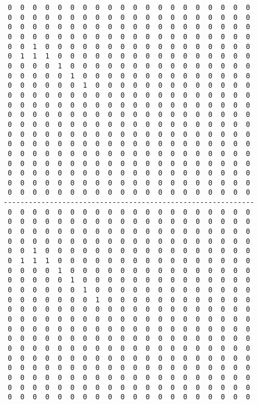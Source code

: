 \begin{verbatim}
 0  0  0  0  0  0  0  0  0  0  0  0  0  0  0  0  0  0  0  0
 0  0  0  0  0  0  0  0  0  0  0  0  0  0  0  0  0  0  0  0
 0  0  0  0  0  0  0  0  0  0  0  0  0  0  0  0  0  0  0  0
 0  0  0  0  0  0  0  0  0  0  0  0  0  0  0  0  0  0  0  0
 0  0  1  0  0  0  0  0  0  0  0  0  0  0  0  0  0  0  0  0
 0  1  1  1  0  0  0  0  0  0  0  0  0  0  0  0  0  0  0  0
 0  0  0  0  1  0  0  0  0  0  0  0  0  0  0  0  0  0  0  0
 0  0  0  0  0  1  0  0  0  0  0  0  0  0  0  0  0  0  0  0
 0  0  0  0  0  0  1  0  0  0  0  0  0  0  0  0  0  0  0  0
 0  0  0  0  0  0  0  0  0  0  0  0  0  0  0  0  0  0  0  0
 0  0  0  0  0  0  0  0  0  0  0  0  0  0  0  0  0  0  0  0
 0  0  0  0  0  0  0  0  0  0  0  0  0  0  0  0  0  0  0  0
 0  0  0  0  0  0  0  0  0  0  0  0  0  0  0  0  0  0  0  0
 0  0  0  0  0  0  0  0  0  0  0  0  0  0  0  0  0  0  0  0
 0  0  0  0  0  0  0  0  0  0  0  0  0  0  0  0  0  0  0  0
 0  0  0  0  0  0  0  0  0  0  0  0  0  0  0  0  0  0  0  0
 0  0  0  0  0  0  0  0  0  0  0  0  0  0  0  0  0  0  0  0
 0  0  0  0  0  0  0  0  0  0  0  0  0  0  0  0  0  0  0  0
 0  0  0  0  0  0  0  0  0  0  0  0  0  0  0  0  0  0  0  0
 0  0  0  0  0  0  0  0  0  0  0  0  0  0  0  0  0  0  0  0
------------------------------------------------------------
 0  0  0  0  0  0  0  0  0  0  0  0  0  0  0  0  0  0  0  0
 0  0  0  0  0  0  0  0  0  0  0  0  0  0  0  0  0  0  0  0
 0  0  0  0  0  0  0  0  0  0  0  0  0  0  0  0  0  0  0  0
 0  0  0  0  0  0  0  0  0  0  0  0  0  0  0  0  0  0  0  0
 0  0  1  0  0  0  0  0  0  0  0  0  0  0  0  0  0  0  0  0
 0  1  1  1  0  0  0  0  0  0  0  0  0  0  0  0  0  0  0  0
 0  0  0  0  1  0  0  0  0  0  0  0  0  0  0  0  0  0  0  0
 0  0  0  0  0  1  0  0  0  0  0  0  0  0  0  0  0  0  0  0
 0  0  0  0  0  0  1  0  0  0  0  0  0  0  0  0  0  0  0  0
 0  0  0  0  0  0  0  1  0  0  0  0  0  0  0  0  0  0  0  0
 0  0  0  0  0  0  0  0  0  0  0  0  0  0  0  0  0  0  0  0
 0  0  0  0  0  0  0  0  0  0  0  0  0  0  0  0  0  0  0  0
 0  0  0  0  0  0  0  0  0  0  0  0  0  0  0  0  0  0  0  0
 0  0  0  0  0  0  0  0  0  0  0  0  0  0  0  0  0  0  0  0
 0  0  0  0  0  0  0  0  0  0  0  0  0  0  0  0  0  0  0  0
 0  0  0  0  0  0  0  0  0  0  0  0  0  0  0  0  0  0  0  0
 0  0  0  0  0  0  0  0  0  0  0  0  0  0  0  0  0  0  0  0
 0  0  0  0  0  0  0  0  0  0  0  0  0  0  0  0  0  0  0  0
 0  0  0  0  0  0  0  0  0  0  0  0  0  0  0  0  0  0  0  0
 0  0  0  0  0  0  0  0  0  0  0  0  0  0  0  0  0  0  0  0
\end{verbatim}
\pagebreak
